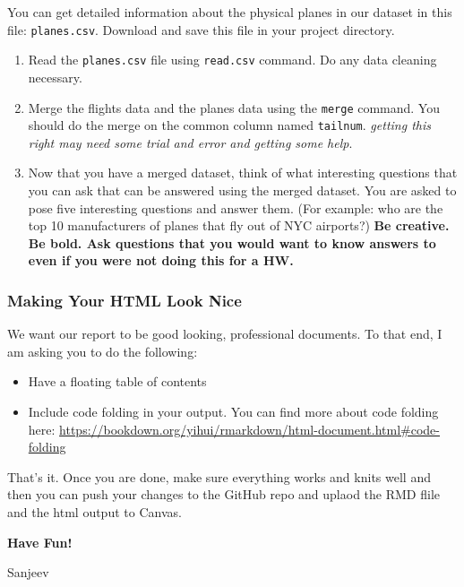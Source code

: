 \documentclass[
]{article}
\begin{document}
You can get detailed information about the physical planes in our
dataset in this file: \texttt{planes.csv}. Download and save this file
in your project directory.

\begin{enumerate}
\def\labelenumi{\alph{enumi})}
\item
  Read the \texttt{planes.csv} file using \texttt{read.csv} command. Do
  any data cleaning necessary.
\item
  Merge the flights data and the planes data using the \texttt{merge}
  command. You should do the merge on the common column named
  \texttt{tailnum}. \emph{getting this right may need some trial and
  error and getting some help}.
\item
  Now that you have a merged dataset, think of what interesting
  questions that you can ask that can be answered using the merged
  dataset. You are asked to pose five interesting questions and answer
  them. (For example: who are the top 10 manufacturers of planes that
  fly out of NYC airports?) \textbf{Be creative. Be bold. Ask questions
  that you would want to know answers to even if you were not doing this
  for a HW. }
\end{enumerate}

\hypertarget{making-your-html-look-nice}{%
\subsubsection{Making Your HTML Look
Nice}\label{making-your-html-look-nice}}

We want our report to be good looking, professional documents. To that
end, I am asking you to do the following:

\begin{itemize}
\item
  Have a floating table of contents
\item
  Include code folding in your output. You can find more about code
  folding here:
  \url{https://bookdown.org/yihui/rmarkdown/html-document.html\#code-folding}
\end{itemize}

That's it. Once you are done, make sure everything works and knits well
and then you can push your changes to the GitHub repo and uplaod the RMD
flile and the html output to Canvas.

\textbf{Have Fun!}

Sanjeev
\end{document}
